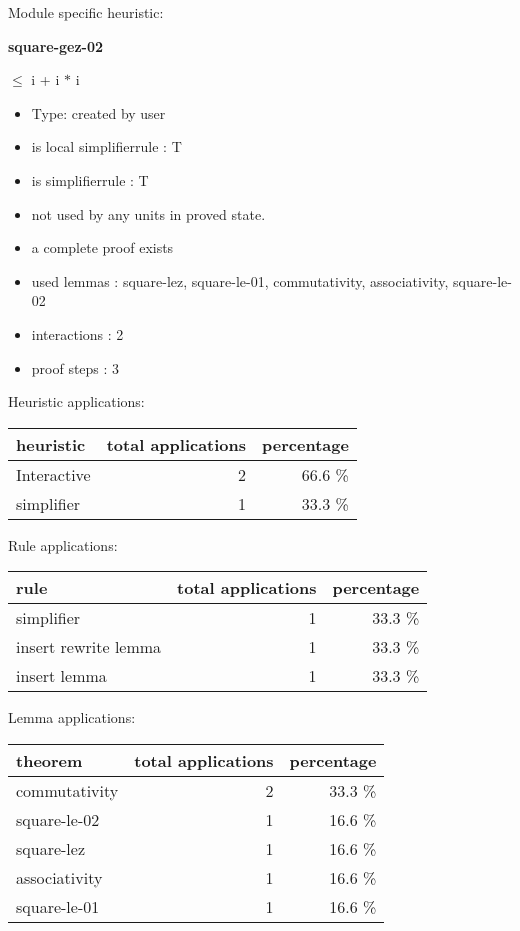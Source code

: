 \documentclass[a4paper]{article}
\begin{document}
Module specific heuristic:

\pagebreak

{\LARGE\bf square-gez-02}\label{lemma-square-gez-02}

\medskip

  $\le$ i + i $*$ i

\begin{itemize}

\item Type: created by user

\item is local simplifierrule : T
\item is simplifierrule : T
\item not used by any units in proved state.
\item       a complete proof exists
\item       used lemmas  : square-lez, square-le-01, commutativity, associativity, square-le-02
\item       interactions : 2
\item       proof steps  : 3
\end{itemize}

\medskip


Heuristic applications:

\begin{supertabular}{l|r|r}
heuristic	& total applications & percentage \\ \hline
Interactive & 2 & 66.6 \% \\
simplifier & 1 & 33.3 \% \\

\end{supertabular}

Rule applications:

\begin{supertabular}{l|r|r}
rule	        & total applications & percentage \\ \hline
simplifier & 1 & 33.3 \% \\
insert rewrite lemma & 1 & 33.3 \% \\
insert lemma & 1 & 33.3 \% \\

\end{supertabular}

Lemma applications:

\begin{supertabular}{l|r|r}
theorem	        & total applications & percentage \\ \hline
commutativity & 2 & 33.3 \% \\
square-le-02 & 1 & 16.6 \% \\
square-lez & 1 & 16.6 \% \\
associativity & 1 & 16.6 \% \\
square-le-01 & 1 & 16.6 \% \\

\end{supertabular}
\end{document}
